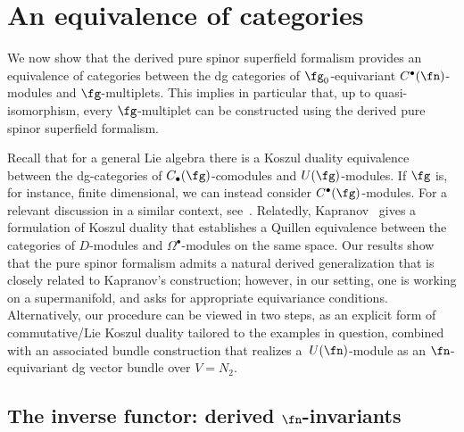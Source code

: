 \documentclass[10pt,a4paper]{amsart}
\numberwithin{equation}{section}
\def\bu{\bullet}
\begin{document}
\section{An equivalence of categories} \label{sec: equiv}
We now show that the derived pure spinor superfield formalism provides an equivalence of categories between the dg categories of $\fg_0$-equivariant $C^\bullet(\fn)$-modules and $\fg$-multiplets. This implies in particular that, up to quasi-isomorphism, every $\fg$-multiplet can be constructed using the derived pure spinor superfield formalism.

\begin{rmk}
	Recall that for a general Lie algebra there is a Koszul duality equivalence between the dg-categories of $C_\bullet(\fg)$-comodules and $U(\fg)$-modules. If $\fg$ is, for instance, finite dimensional, we can instead consider $C^\bullet(\fg)$-modules. For a relevant discussion in a similar context, see~\mbox{\cite[Sections~7 and~8]{CostelloYangian}}. Relatedly, Kapranov~\cite{Kapranov} gives a formulation of Koszul duality that establishes a Quillen equivalence between the categories of $D$-modules and $\Omega^\bu$-modules on the same space. Our results show that the pure spinor formalism admits a natural derived generalization that is closely related to Kapranov's construction; however, in our setting, one is working on a supermanifold, and asks for appropriate equivariance conditions. Alternatively, our procedure can be viewed in two steps, as an explicit form of commutative/Lie Koszul duality tailored to the examples in question, combined with an associated bundle construction that realizes a~$U(\fn)$-module as an $\fn$-equivariant dg vector bundle over $V = N_2$.
\end{rmk}

\subsection[The inverse functor: derived n-invariants]{The inverse functor: derived $\boldsymbol{\fn}$-invariants}
\end{document}
